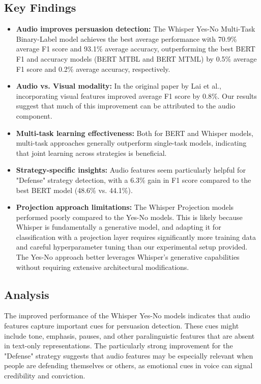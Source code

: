 \documentclass{article}
\begin{document}
\subsection{Key Findings}
\begin{itemize}
    \item \textbf{Audio improves persuasion detection:} The Whisper Yes-No Multi-Task Binary-Label model achieves the best average performance with 70.9\% average F1 score and 93.1\% average accuracy, outperforming the best BERT F1 and accuracy models (BERT MTBL and BERT MTML) by 0.5\% average F1 score and 0.2\% average accuracy, respectively.
    
    \item \textbf{Audio vs. Visual modality:} In the original paper by Lai et al., incorporating visual features improved average F1 score by 0.8\%. Our results suggest that much of this improvement can be attributed to the audio component.
    
    \item \textbf{Multi-task learning effectiveness:} Both for BERT and Whisper models, multi-task approaches generally outperform single-task models, indicating that joint learning across strategies is beneficial.
    
    \item \textbf{Strategy-specific insights:} Audio features seem particularly helpful for "Defense" strategy detection, with a 6.3\% gain in F1 score compared to the best BERT model (48.6\% vs. 44.1\%).
    
    \item \textbf{Projection approach limitations:} The Whisper Projection models performed poorly compared to the Yes-No models. This is likely because Whisper is fundamentally a generative model, and adapting it for classification with a projection layer requires significantly more training data and careful hyperparameter tuning than our experimental setup provided. The Yes-No approach better leverages Whisper's generative capabilities without requiring extensive architectural modifications.
\end{itemize}

\subsection{Analysis}
The improved performance of the Whisper Yes-No models indicates that audio features capture important cues for persuasion detection. These cues might include tone, emphasis, pauses, and other paralinguistic features that are absent in text-only representations. The particularly strong improvement for the "Defense" strategy suggests that audio features may be especially relevant when people are defending themselves or others, as emotional cues in voice can signal credibility and conviction.
\end{document}
